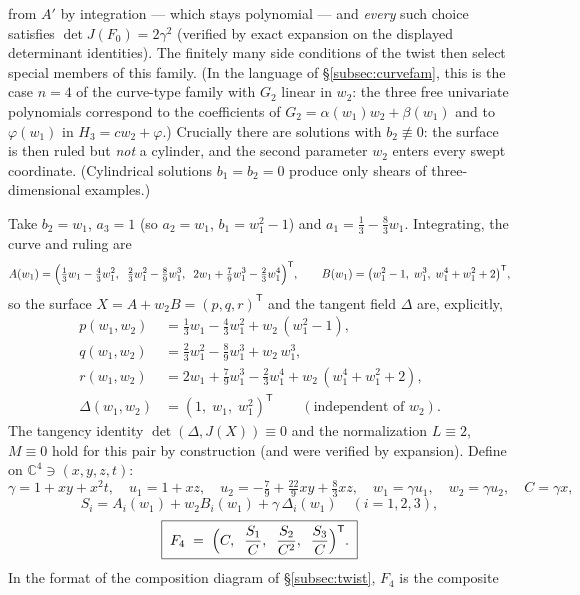 \documentclass[11pt]{article}
\numberwithin{equation}{section}
\theoremstyle{plain}
\theoremstyle{definition}
\theoremstyle{remark}
\newcommand{\C}{\mathbb{C}}
\begin{document}
from $A'$ by integration --- which stays polynomial --- and \emph{every}
such choice satisfies $\det J(F_0)=2\gamma^2$ (verified by exact expansion on
the displayed determinant identities). The finitely many side conditions of the twist then select
special members of this family. (In the language of \S\ref{subsec:curvefam},
this is the case $n=4$ of the curve-type family with $G_2$ linear in $w_2$:
the three free univariate polynomials correspond to the coefficients of
$G_2=\alpha(w_1)w_2+\beta(w_1)$ and to $\varphi(w_1)$ in
$H_3=cw_2+\varphi$.)
Crucially there are solutions with $b_2\not\equiv0$: the surface is then ruled but
\emph{not} a cylinder, and the second parameter $w_2$ enters every swept
coordinate. (Cylindrical solutions $b_1=b_2=0$ produce only shears of
three-dimensional examples.)

Take $b_2=w_1$, $a_3=1$ (so $a_2=w_1$, $b_1=w_1^2-1$) and
$a_1=\tfrac13-\tfrac83w_1$. Integrating, the curve and ruling are
\[
A(w_1)=\Bigl(\tfrac13w_1-\tfrac43w_1^2,\;\;
\tfrac23w_1^2-\tfrac89w_1^3,\;\;
2w_1+\tfrac79w_1^3-\tfrac23w_1^4\Bigr)^{\mathsf T},\qquad
B(w_1)=\bigl(w_1^2-1,\;w_1^3,\;w_1^4+w_1^2+2\bigr)^{\mathsf T},
\]
so the surface $X=A+w_2B=(p,q,r)^{\mathsf T}$ and the tangent field $\Delta$ are, explicitly,
\begin{align*}
p(w_1,w_2)&=\tfrac13w_1-\tfrac43w_1^2+w_2\,(w_1^2-1),\\
q(w_1,w_2)&=\tfrac23w_1^2-\tfrac89w_1^3+w_2\,w_1^3,\\
r(w_1,w_2)&=2w_1+\tfrac79w_1^3-\tfrac23w_1^4+w_2\,(w_1^4+w_1^2+2),\\
\Delta(w_1,w_2)&=(1,\;w_1,\;w_1^2)^{\mathsf T}
\qquad(\text{independent of }w_2).
\end{align*}
The tangency identity $\det(\Delta,J(X))\equiv0$ and the
normalization $L\equiv2$, $M\equiv0$ hold for this pair by construction (and were
verified by expansion).
Define on $\C^4\ni(x,y,z,t)$:
\[
\gamma=1+xy+x^2t,\quad u_1=1+xz,\quad
u_2=-\tfrac79+\tfrac{22}9xy+\tfrac83xz,\quad
w_1=\gamma u_1,\quad w_2=\gamma u_2,\quad C=\gamma x,
\]
\[
S_i=A_i(w_1)+w_2B_i(w_1)+\gamma\,\Delta_i(w_1)\quad(i=1,2,3),
\]
\[
\boxed{\;F_4\;=\;\Bigl(C,\;\;\frac{S_1}{C},\;\;\frac{S_2}{C^2},\;\;\frac{S_3}{C}\Bigr)^{\mathsf T}.\;}
\]
In the format of the composition diagram of \S\ref{subsec:twist}, $F_4$ is the
composite
\end{document}
